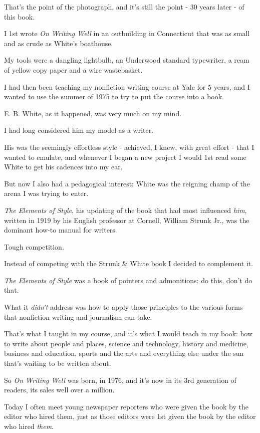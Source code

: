 \documentclass{book}
\numberwithin{equation}{section}
\begin{document}
That's the point of the photograph, and it's still the point - 30 years later - of this book.

%
I 1st wrote \textit{On Writing Well} in an outbuilding in Connecticut that was as small and as crude as White's boathouse.

My tools were a dangling lightbulb, an Underwood standard typewriter, a ream of yellow copy paper and a wire wastebasket.

I had then been teaching my nonfiction writing course at Yale for 5 years, and I wanted to use the summer of 1975 to try to put the course into a book.

%
E. B. White, as it happened, was very much on my mind.

I had long considered him my model as a writer.

His was the seemingly effortless style - achieved, I knew, with great effort - that I wanted to emulate, and whenever I began a new project I would 1st read some White to get his cadences into my ear.

But now I also had a pedagogical interest: White was the reigning champ of the arena I was trying to enter.

\textit{The Elements of Style}, his updating of the book that had most influenced \textit{him}, written in 1919 by his English professor at Cornell, William Strunk Jr., was the dominant how-to manual for writers.

Tough competition.

%
Instead of competing with the Strunk \& White book I decided to complement it.

\textit{The Elements of Style} was a book of pointers and admonitions: do this, don't do that.

What it \textit{didn't} address was how to apply those principles to the various forms that nonfiction writing and journalism can take.

That's what I taught in my course, and it's what I would teach in my book: how to write about people and places, science and technology, history and medicine, business and education, sports and the arts and everything else under the sun that's waiting to be written about.

So \textit{On Writing Well} was born, in 1976, and it's now in its 3rd generation of readers, its sales well over a million.

Today I often meet young newspaper reporters who were given the book by the editor who hired them, just as those editors were 1st given the book by the editor who hired \textit{them}.
\end{document}
